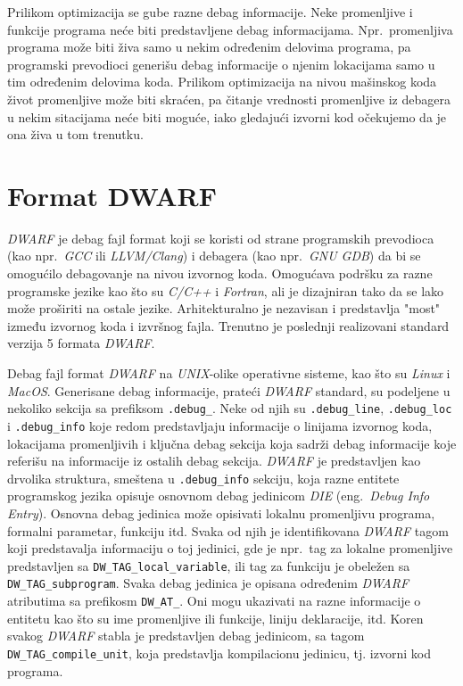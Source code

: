 \documentclass[12pt,oneside]{memoir}
\begin{document}
Prilikom optimizacija se gube razne debag informacije. Neke promenljive i funkcije programa neće biti predstavljene debag informacijama. Npr.~promenljiva programa može biti živa samo u nekim određenim delovima programa, pa programski prevodioci generišu debag informacije o njenim lokacijama samo u tim određenim delovima koda. Prilikom optimizacija na nivou mašinskog koda život promenljive može biti skraćen, pa čitanje vrednosti promenljive iz debagera u nekim sitacijama neće biti moguće, iako gledajući izvorni kod očekujemo da je ona živa u tom trenutku.

\section{Format DWARF}

\emph{DWARF} je debag fajl format koji se koristi od strane programskih prevodioca (kao npr.~\emph{GCC} ili \emph{LLVM/Clang}) i debagera (kao npr.~\emph{GNU GDB}) da bi se omogućilo debagovanje na nivou izvornog koda. Omogućava podršku za razne programske jezike kao što su \emph{C/C++} i \emph{Fortran}, ali je dizajniran tako da se lako može proširiti na ostale jezike. Arhitekturalno je nezavisan i predstavlja "most" između izvornog koda i izvršnog fajla. Trenutno je poslednji realizovani standard verzija 5 formata \emph{DWARF}.

Debag fajl format \emph{DWARF} na \emph{UNIX}-olike operativne sisteme, kao što su \emph{Linux} i \emph{MacOS}. Generisane debag informacije, prateći \emph{DWARF} standard, su podeljene u nekoliko sekcija sa prefiksom \texttt{.debug\_}. Neke od njih su \texttt{.debug\_line}, \texttt{.debug\_loc} i \texttt{.debug\_info} koje redom predstavljaju informacije o linijama izvornog koda, lokacijama promenljivih i ključna debag sekcija koja sadrži debag informacije koje referišu na informacije iz ostalih debag sekcija.
\emph{DWARF} je predstavljen kao drvolika struktura, smeštena u \texttt{.debug\_info} sekciju,  koja razne entitete programskog jezika opisuje osnovnom debag jedinicom \emph{DIE} (eng.~\emph{Debug Info Entry}). Osnovna debag jedinica može opisivati lokalnu promenljivu programa, formalni parametar, funkciju itd. Svaka od njih je identifikovana \emph{DWARF} tagom koji predstavalja informaciju o toj jedinici, gde je npr.~tag za lokalne promenljive predstavljen sa \texttt{DW\_TAG\_local\_variable}, ili tag za funkciju je obeležen sa \texttt{DW\_TAG\_subprogram}. Svaka debag jedinica je opisana određenim \emph{DWARF} atributima sa prefikosm \texttt{DW\_AT\_}. Oni mogu ukazivati na razne informacije o entitetu kao što su ime promenljive ili funkcije, liniju deklaracije, itd. Koren svakog \emph{DWARF} stabla je predstavljen debag jedinicom, sa tagom  \texttt{DW\_TAG\_compile\_unit}, koja predstavlja kompilacionu jedinicu, tj. izvorni kod programa.
\end{document}

